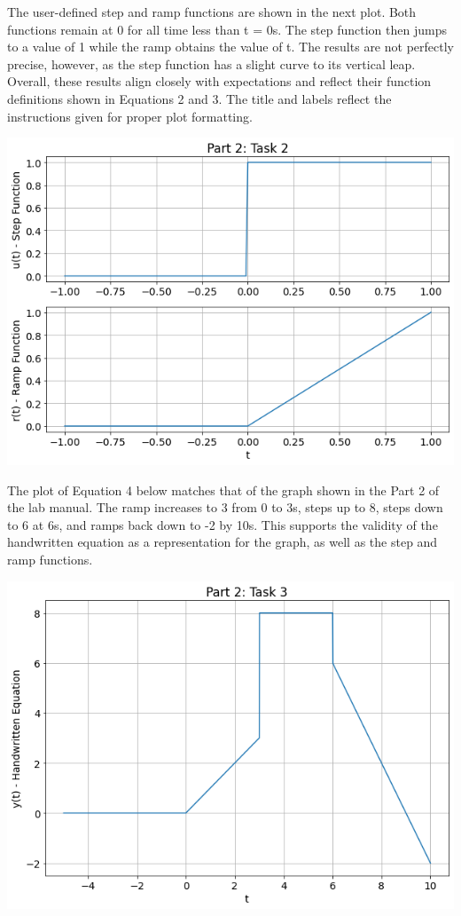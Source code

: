 \documentclass[12pt]{report}
\begin{document}
The user-defined step and ramp functions are shown in the next plot. Both functions remain at 0 for all time less than t = 0s. The step function then jumps to a value of 1 while the ramp obtains the value of t. The results are not perfectly precise, however, as the step function has a slight curve to its vertical leap. Overall, these results align closely with expectations and reflect their function definitions shown in Equations 2 and 3. The title and labels reflect the instructions given for proper plot formatting. \\

\begin{center}
    \includegraphics[scale = 0.35]{Lab 2 - Plots/Part2-Task2.png}\\[1.0 cm]
\end{center}

The plot of Equation 4 below matches that of the graph shown in the Part 2 of the lab manual. The ramp increases to 3 from 0 to 3s, steps up to 8, steps down to 6 at 6s, and ramps back down to -2 by 10s. This supports the validity of the handwritten equation as a representation for the graph, as well as the step and ramp functions. \\  

\begin{center}
    \includegraphics[scale = 0.39]{Lab 2 - Plots/Part2-Task3.png}\\[1.0 cm]
\end{center}
\end{document}
